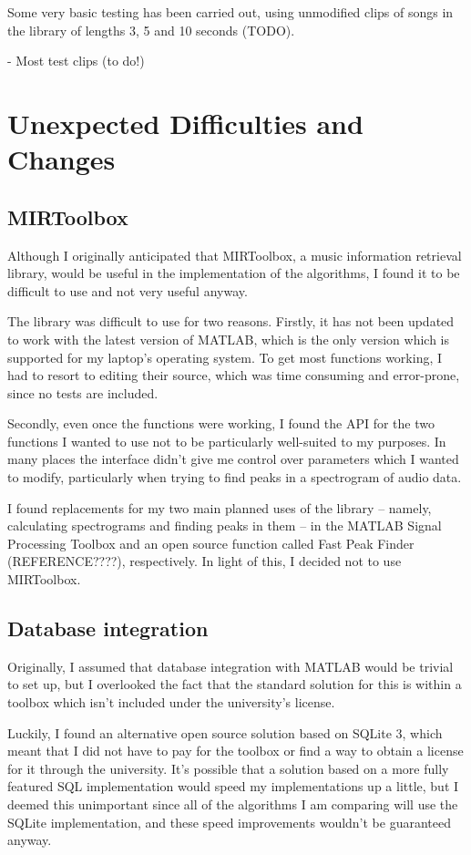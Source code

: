 \documentclass[12pt]{article}
\begin{document}
Some very basic testing has been carried out, using unmodified clips of songs in the library of lengths 3, 5 and 10 seconds (TODO). 

- Most test clips (to do!)

\section*{Unexpected Difficulties and Changes}

\subsection*{MIRToolbox}

Although I originally anticipated that MIRToolbox, a music information retrieval library, would be useful in the implementation of the algorithms, I found it to be difficult to use and not very useful anyway. 

The library was difficult to use for two reasons. Firstly, it has not been updated to work with the latest version of MATLAB, which is the only version which is supported for my laptop's operating system. To get most functions working, I had to resort to editing their source, which was time consuming and error-prone, since no tests are included.

Secondly, even once the functions were working, I found the API for the two functions I wanted to use not to be particularly well-suited to my purposes. In many places the interface didn't give me control over parameters which I wanted to modify, particularly when trying to find peaks in a spectrogram of audio data.

I found replacements for my two main planned uses of the library -- namely, calculating spectrograms and finding peaks in them -- in the MATLAB Signal Processing Toolbox and an open source function called Fast Peak Finder (REFERENCE????), respectively. In light of this, I decided not to use MIRToolbox.

\subsection*{Database integration}

Originally, I assumed that database integration with MATLAB would be trivial to set up, but I overlooked the fact that the standard solution for this is within a toolbox which isn't included under the university's license. 

Luckily, I found an alternative open source solution based on SQLite 3, which meant that I did not have to pay for the toolbox or find a way to obtain a license for it through the university. It's possible that a solution based on a more fully featured SQL implementation would speed my implementations up a little, but I deemed this unimportant since all of the algorithms I am comparing will use the SQLite implementation, and these speed improvements wouldn't be guaranteed anyway.
\end{document}
